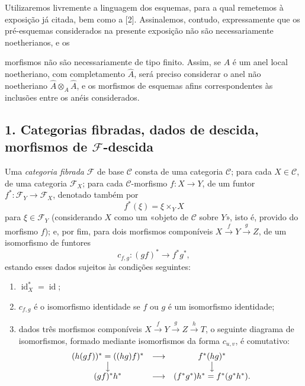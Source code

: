 Utilizaremos livremente a linguagem dos esquemas, para a qual remetemos à
exposição já citada, bem como a [2]. Assinalemos, contudo, expressamente que os
pré-esquemas considerados na presente exposição não são necessariamente
noetherianos, e os

morfismos não são necessariamente de tipo finito. Assim, se $A$ é um anel local
noetheriano, com completamento $\widehat A$, será preciso considerar o anel não
noetheriano $\widehat A\otimes_A\widehat A$, e os morfismos de esquemas afins
correspondentes às inclusões entre os anéis considerados.


\subsection*{1. Categorias fibradas, dados de descida, morfismos de
$\mathcal F$-descida}

 Uma \emph{categoria fibrada} $\mathcal F$ de base
$\mathcal C$ consta de uma categoria $\mathcal C$; para cada
$X\in\mathcal C$, de uma categoria $\mathcal F_X$; para cada
$\mathcal C$-morfismo $f:X\longrightarrow Y$, de um funtor
$f^*:\mathcal F_Y\longrightarrow\mathcal F_X$, denotado também por
\[
  f^*(\xi)=\xi\times_Y X
\]
para $\xi\in\mathcal F_Y$ (considerando $X$ como um «objeto de
$\mathcal C$ sobre $Y$», isto é, provido do morfismo $f$); e, por fim,
para dois morfismos componíveis
$X\xrightarrow{f}Y\xrightarrow{g}Z$, de um isomorfismo de funtores
\[
  c_{f,g}:(gf)^*\longrightarrow f^*g^*,
\]
estando esses dados sujeitos às condições seguintes:

\begin{enumerate}
\item[(i)] $\operatorname{id}_X^*=\operatorname{id}$;
\item[(ii)] $c_{f,g}$ é o isomorfismo identidade se $f$ ou $g$ é um
isomorfismo identidade;
\item[(iii)] dados três morfismos componíveis
$X\xrightarrow{f}Y\xrightarrow{g}Z\xrightarrow{h}T$, o seguinte diagrama de
isomorfismos, formado mediante isomorfismos da forma $c_{u,v}$, é
comutativo:
\[
\begin{array}{ccc}
  (h(gf))^*=((hg)f)^* & \longrightarrow & f^*(hg)^* \\
  \big\downarrow && \big\downarrow \\
  (gf)^*h^* & \longrightarrow & (f^*g^*)h^*=f^*(g^*h^*).
\end{array}
\]
\end{enumerate}


